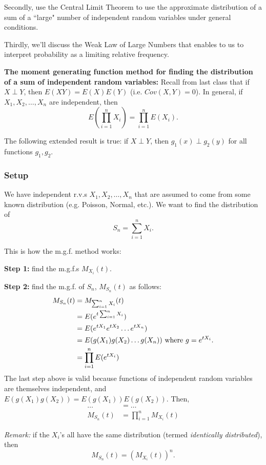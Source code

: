 \documentclass[12pt]{article}
\begin{document}
Secondly, use the Central Limit Theorem to use the approximate distribution of a sum of a ``large" number of independent random variables under general conditions.

Thirdly, we'll discuss the Weak Law of Large Numbers that enables to us to interpret probability as a limiting relative frequency. 

\textbf{The moment generating function method for finding the distribution of a sum of independent random variables:} Recall from last class that if $X \perp Y$, then $E(XY) = E(X)E(Y)$ (i.e. $Cov(X,Y) = 0$). In general, if $X_1, X_2, \dots, X_n$ are independent, then
\[
    E\left(\prod_{i = 1}^n X_i\right) = \prod_{i = 1}^n E(X_i).
\]

The following extended result is true: if $X \perp Y$, then $g_1 (x) \perp g_2 (y)$ for all functions $g_1, g_2$.

\subsubsection{Setup}
We have independent r.v.s $X_1, X_2, \dots, X_n$ that are assumed to come from some known distribution (e.g. Poisson, Normal, etc.). We want to find the distribution of
\[
    S_n = \sum_{i = 1}^n X_i.
\]

This is how the m.g.f. method works:

\textbf{Step 1:} find the m.g.f.s $M_{X_i} (t)$.

\textbf{Step 2:} find the m.g.f. of $S_n$, $M_{S_n} (t)$ as follows:
\begin{align*}
    M_{S_n} (t) &= M_{\sum_{i = 1}^n X_i} (t) \\
        &= E(e^{t \sum_{i = 1}^n X_i}) \\
        &= E(e^{t X_1} e^{t X_2} \dots e^{t X_n}) \\
        &= E(g(X_1) g(X_2) \dots g(X_n)) \textnormal{ where $g = e^{t X_i}$.} \\
        &= \prod_{i = 1}^n E(e^{t X_i}) 
\end{align*}
The last step above is valid because functions of independent random variables are themselves independent, and $E(g(X_1) g(X_2)) = E(g(X_1)) E(g(X_2))$. Then,
\begin{align*}
    \dots &= \dots \\
    M_{S_n} (t) &= \prod_{i = 1}^n M_{X_i} (t)
\end{align*}

\emph{Remark:} if the $X_i$'s all have the same distribution (termed \emph{identically distributed}), then
\[
    M_{S_n} (t) = (M_{X_i} (t))^n.
\]
\end{document}
